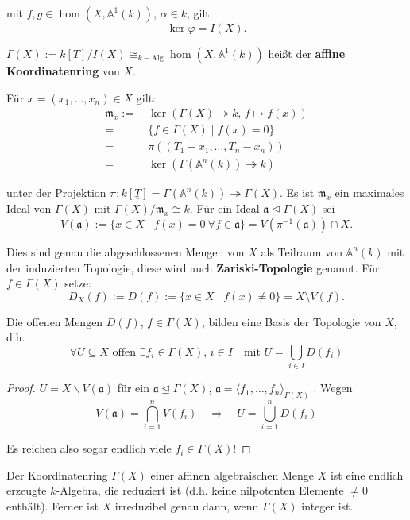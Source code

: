 mit $f,g\in\hom(X,\mathbb{A}^{1}(k))$, $\alpha\in k$, gilt:
\[
  \ker\varphi=I(X).
\]
\begin{defn}
  \label{def:koordinatenring}
  $\Gamma(X):=k[\underline{T}]/I(X)\cong_{k-\mathrm{Alg}}\hom(X,\mathbb{A}^{1}(k))$ heißt der \textbf{affine
    Koordinatenring }von $X$.

  Für $x=(x_{1},\ldots,x_{n})\in X$ gilt:
  \begin{align*}
    \mathfrak{m}_{x}:=\  & \ker(\Gamma(X)\twoheadrightarrow k,\,f\mapsto f(x))\\
    =\  & \{f\in\Gamma(X)\mid f(x)=0\}\\
    =\  & \pi((T_{1}-x_{1},\ldots,T_{n}-x_{n}))\\
    =\  & \ker(\Gamma(\mathbb{A}^{n}(k))\twoheadrightarrow k)
  \end{align*}

  unter der Projektion $\pi:k[\underline{T}]=\Gamma(\mathbb{A}^{n}(k))\twoheadrightarrow\Gamma(X)$.
  Es ist $\mathfrak{m}_{x}$ ein maximales Ideal von $\Gamma(X)$ mit
  $\Gamma(X)/\mathfrak{m}_{x}\cong k$. Für ein Ideal $\mathfrak{a}\unlhd\Gamma(X)$
  sei
  \[
    V(\mathfrak{a}):=\{x\in X\mid f(x)=0\ \forall f\in\mathfrak{a}\}=V(\pi^{-1}(\mathfrak{a}))\cap X.
  \]

  Dies sind genau die abgeschlossenen Mengen von $X$ als Teilraum von
  $\mathbb{A}^{n}(k)$ mit der induzierten Topologie, diese wird auch
  \textbf{Zariski-Topologie} genannt. Für $f\in\Gamma(X)$ setze:
  \[
    D_X(f) := D(f):=\{x\in X\mid f(x)\neq0\}=X\setminus V(f).
  \]
\end{defn}
\begin{lem}
  \label{lem:basis-zariski-topologie}
  Die offenen Mengen $D(f)$, $f\in\Gamma(X)$, bilden eine Basis der
  Topologie von $X$, d.h.
  \[
    \forall U\subseteq X\text{ offen }\exists f_{i}\in\Gamma(X),\,i\in I\quad\text{mit }U=\bigcup_{i\in I}D(f_{i})
  \]
\end{lem}
\begin{proof}
  $U=X\backslash V(\mathfrak{a})$ für ein $\mathfrak{a}\unlhd\Gamma(X)$,
  $\mathfrak{a}=\langle f_{1},\ldots,f_{n}\rangle_{\Gamma(X)}$ . Wegen
  \[
    V(\mathfrak{a})=\bigcap_{i=1}^{n}V(f_{i})\quad\Rightarrow\quad U=\bigcup_{i=1}^{n}D(f_{i})
  \]

  Es reichen also sogar endlich viele $f_{i} \in \Gamma(X)$! 
\end{proof}
\begin{prop}
  \label{prop:eigenschaften-koordinatenring}
  Der Koordinatenring $\Gamma(X)$ einer affinen algebraischen Menge
  $X$ ist eine endlich erzeugte $k$-Algebra, die reduziert ist (d.h.
  keine nilpotenten Elemente $\neq0$ enthält). Ferner ist $X$ irreduzibel
  genau dann, wenn $\Gamma(X)$ integer ist.
\end{prop}
